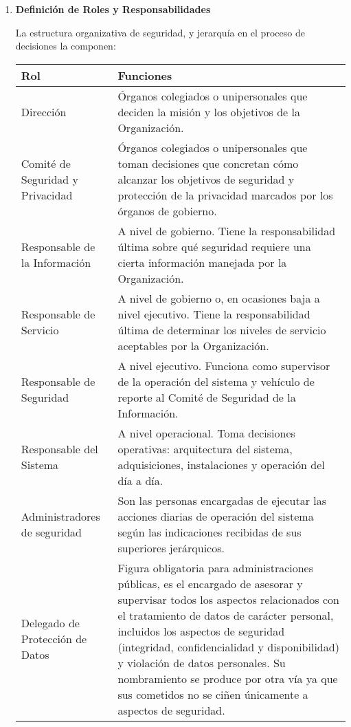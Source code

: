 \begin{enumerate}[label=\alph*)]
\item \textbf{Definici\'on de Roles y Responsabilidades}

La estructura organizativa de seguridad, y jerarqu\'ia en el proceso de decisiones la componen:

\begin{tabular}{|p{4cm}|p{11cm}|}
\hline
\textbf{Rol} & \textbf{Funciones} \\
\hline
Direcci\'on & \'{O}rganos colegiados o unipersonales que deciden la misi\'on y los objetivos de la Organizaci\'on. \\
\hline
Comit\'e de Seguridad y Privacidad & \'{O}rganos colegiados o unipersonales que toman decisiones que concretan c\'omo alcanzar los objetivos de seguridad y protecci\'on de la privacidad marcados por los \'{o}rganos de gobierno. \\
\hline
Responsable de la Informaci\'on & A nivel de gobierno. Tiene la responsabilidad \'{u}ltima sobre qu\'e seguridad requiere una cierta informaci\'on manejada por la Organizaci\'on. \\
\hline
Responsable de Servicio & A nivel de gobierno o, en ocasiones baja a nivel ejecutivo. Tiene la responsabilidad \'{u}ltima de determinar los niveles de servicio aceptables por la Organizaci\'on. \\
\hline
Responsable de Seguridad & A nivel ejecutivo. Funciona como supervisor de la operaci\'on del sistema y veh\'iculo de reporte al Comit\'e de Seguridad de la Informaci\'on. \\
\hline
Responsable del Sistema & A nivel operacional. Toma decisiones operativas: arquitectura del sistema, adquisiciones, instalaciones y operaci\'on del d\'ia a d\'ia. \\
\hline
Administradores de seguridad & Son las personas encargadas de ejecutar las acciones diarias de operaci\'on del sistema seg\'un las indicaciones recibidas de sus superiores jer\'arquicos. \\
\hline
Delegado de Protecci\'on de Datos & Figura obligatoria para administraciones p\'ublicas, es el encargado de asesorar y supervisar todos los aspectos relacionados con el tratamiento de datos de car\'acter personal, incluidos los aspectos de seguridad (integridad, confidencialidad y disponibilidad) y violaci\'on de datos personales. Su nombramiento se produce por otra v\'ia ya que sus cometidos no se ci\~nen \'{u}nicamente a aspectos de seguridad. \\
\hline
\end{tabular}


\end{enumerate}
